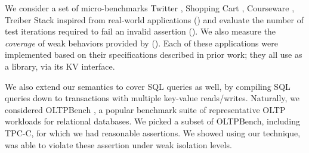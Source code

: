 
We consider a set of micro-benchmarks Twitter \cite{twissandra}, Shopping Cart \cite{DBLP:conf/pldi/Sivaramakrishnan15}, Courseware \cite{DBLP:conf/esop/NairP020}, Treiber Stack \cite{DBLP:conf/cav/NagarMJ20} inspired from real-world applications 
() and evaluate the number of test iterations
required to fail an invalid assertion 
(). We also measure the \textit{coverage} of
weak behaviors provided by \tool{} (). Each of these
applications were implemented based on their specifications described in prior
work; they all use \tool{} as a library, via its KV interface.  


We also extend our semantics to cover SQL queries as well, by compiling SQL queries down to transactions with multiple key-value reads/writes. Naturally, we considered OLTPBench \cite{DBLP:journals/pvldb/DifallahPCC13}, a popular benchmark suite of representative 
OLTP workloads for relational databases. We picked a subset of OLTPBench, including TPC-C, for which we had reasonable assertions. We showed using our technique, \tool{} was able to violate these assertion under weak isolation levels.

